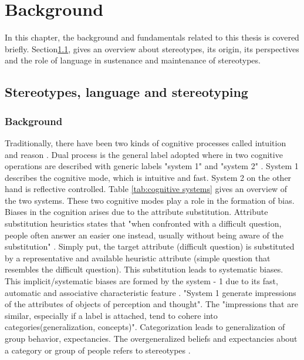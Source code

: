 \chapter{Background}

In this chapter, the background and fundamentals related to this thesis is covered briefly. Section\ref{stereotypes, language}, gives an overview about stereotypes, its origin, its perspectives and the role of language in sustenance and maintenance of stereotypes. 

\section{Stereotypes, language and stereotyping} \label{stereotypes, language}
\subsection{Background}

Traditionally, there have been two kinds of cognitive processes called intuition and reason \cite{kahneman2002representativeness}. Dual process is the general label adopted where in two cognitive operations are described with generic labels "system 1" and "system 2" \cite{kahneman2002representativeness}. System 1 describes the cognitive mode, which is intuitive and fast. System 2 on the other hand is reflective  controlled. Table \ref{tab:cognitive systems} gives an overview of the two systems. These two cognitive modes play a role in the formation of bias. Biases in the cognition arises due to the attribute substitution. Attribute substitution heuristics states that "when confronted with a difficult question, people often answer an easier one instead, usually
without being aware of the substitution" \cite{kahneman2002representativeness}. Simply put, the target attribute (difficult question) is substituted by a representative and available heuristic attribute (simple question that resembles the difficult question). This substitution leads to systematic biases. This implicit/systematic biases are formed by the system - 1 due to its fast, automatic and associative characteristic feature \cite{kahneman2002representativeness}. "System 1 generate impressions of the attributes of objects of perception and thought"\cite{kahneman2003maps}. The "impressions that are similar, especially if a label is attached, tend to cohere into categories(generalization, concepts)"\cite{fiske1998stereotyping}. Categorization leads to generalization of group behavior, expectancies. The overgeneralized beliefs and expectancies about a category or group of people refers to stereotypes \cite{allport1954nature}\cite{fiske1998stereotyping}. 

